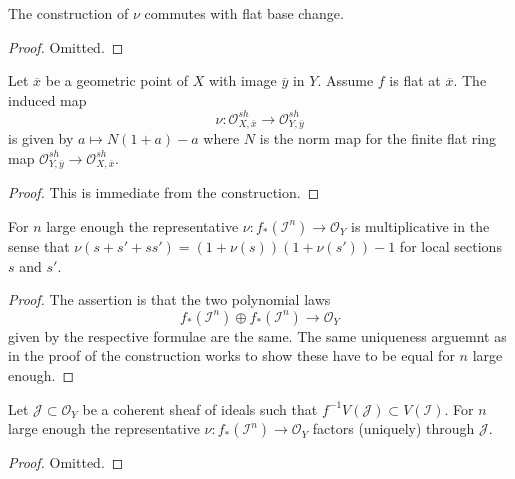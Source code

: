 \begin{lemma}
\label{lemma-base-change-norm}
The construction of $\nu$ commutes with flat base change.
\end{lemma}

\begin{proof}
Omitted.
\end{proof}

\begin{lemma}
\label{lemma-stalks-norm}
Let $\overline{x}$ be a geometric point of $X$ with
image $\overline{y}$ in $Y$. Assume $f$ is flat at $\overline{x}$.
The induced map
$$
\nu : \mathcal{O}^{sh}_{X, \overline{x}} \to \mathcal{O}^{sh}_{Y, \overline{y}}
$$
is given by $a \mapsto N(1 + a) - a$ where $N$ is the norm map
for the finite flat ring map
$\mathcal{O}^{sh}_{Y, \overline{y}} \to \mathcal{O}^{sh}_{X, \overline{x}}$.
\end{lemma}

\begin{proof}
This is immediate from the construction.
\end{proof}

\begin{lemma}
\label{lemma-multiplicative-norm}
For $n$ large enough the representative
$\nu : f_*(\mathcal{I}^n) \to \mathcal{O}_Y$
is multiplicative in the sense that
$\nu(s + s' + ss') = (1 + \nu(s))(1 + \nu(s')) - 1$
for local sections $s$ and $s'$.
\end{lemma}

\begin{proof}
The assertion is that the two polynomial laws
$$
f_*(\mathcal{I}^n) \oplus f_*(\mathcal{I}^n) \to \mathcal{O}_Y
$$
given by the respective formulae are the same. The same uniqueness
arguemnt as in the proof of the construction works to show these
have to be equal for $n$ large enough.
\end{proof}

\begin{lemma}
\label{lemma-ideals-norm}
Let $\mathcal{J} \subset \mathcal{O}_Y$ be a coherent sheaf of ideals
such that $f^{-1}V(\mathcal{J}) \subset V(\mathcal{I})$.
For $n$ large enough the representative
$\nu : f_*(\mathcal{I}^n) \to \mathcal{O}_Y$
factors (uniquely) through $\mathcal{J}$.
\end{lemma}

\begin{proof}
Omitted.
\end{proof}

